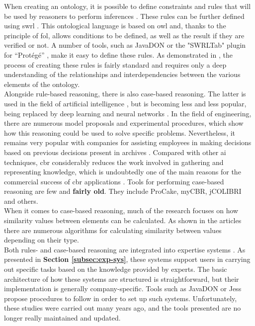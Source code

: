             When creating an ontology, it is possible to define constraints and rules that will be used by reasoners to perform inferences \cite{noy2001ontology}. These rules can be further defined using \acrfull{swrl} \cite{liu2010ontology, abadi2018improving}. This ontological language is based on \acrshort{owl} and, thanks to the principle of \acrfull{fol}, allows conditions to be defined, as well as the result if they are verified or not. A number of tools, such as JavaDON \cite{jovanovic2005achieving} or the "SWRLTab" plugin for “Protégé” \cite{liu2010ontology}, make it easy to define these rules. As demonstrated in \cite{li2018ontology, jeon2016automatic, na2016development}, the process of creating these rules is fairly standard and requires only a deep understanding of the relationships and interdependencies between the various elements of the ontology.\\

            Alongside rule-based reasoning, there is also case-based reasoning. The latter is used in the field of artificial intelligence \cite{wilke1995fallbasiertes, althoff1992fallbasiertes}, but is becoming less and less popular, being replaced by deep learning and neural networks \cite{wiratunga2011case}. In the field of engineering, there are numerous model proposals and experimental procedures, which show how this reasoning could be used to solve specific problems. Nevertheless, it remains very popular with companies for assisting employees in making decisions based on previous decisions present in archives \cite{eshach2003case}. Compared with other \acrshort{ai} techniques, \acrshort{cbr} considerably reduces the work involved in gathering and representing knowledge, which is undoubtedly one of the main reasons for the commercial success of \acrshort{cbr} applications \cite{benjamin2006using, wiratunga2011case}. Tools for performing case-based reasoning are few and \textbf{fairly old}. They include ProCake, myCBR, jCOLIBRI and others.\\

            When it comes to case-based reasoning, much of the research focuses on how similarity values between elements can be calculated. As shown in the articles \cite{shaheen2020novel, chen2012recommendation, wang2020similarity, malburg2021improving, racharak2021approximation, adel2022interval} there are numerous algorithms for calculating similarity between values depending on their type.\\

            Both rules- and case-based reasoning are integrated into expertise systems \cite{lin2021multivariable}. As presented in \textbf{Section \ref{subsec:exp-sys}}, these systems support users in carrying out specific tasks based on the knowledge provided by experts. The basic architecture of how these systems are structured is straightforward, but their implementation is generally company-specific. Tools such as JavaDON or Jess propose procedures to follow in order to set up such systems. Unfortunately, these studies were carried out many years ago, and the tools presented are no longer really maintained and updated.\\

